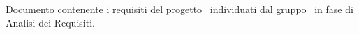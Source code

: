 Documento contenente i requisiti del progetto \progetto\ individuati dal gruppo \gruppo\ in fase di Analisi dei Requisiti.